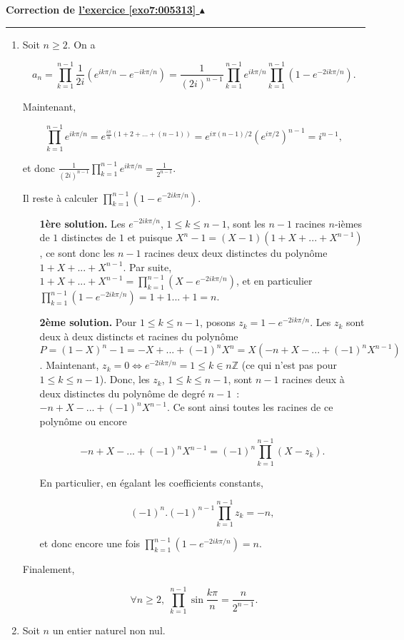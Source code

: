 \documentclass[11pt,a4paper]{article}
\newcommand{\Zz}{\mathbb{Z}} \newcommand{\Z}{\mathbb{Z}}
\newcounter{exo}
\newcommand{\correction}[1]{\hypertarget{cor7:#1}{}\label{cor7:#1}{\bf Correction de \hyperlink{exo7:#1}{l'exercice \ref{exo7:#1} $\blacktriangle$}}\vspace{1mm}\hrule\vspace{1mm}}
\begin{document}
\correction{005313}
\begin{enumerate}
\item  Soit $n\geq2$. On a 

$$a_n=\prod_{k=1}^{n-1}\frac{1}{2i}(e^{ik\pi/n}-e^{-ik\pi/n})=\frac{1}{(2i)^{n-1}}\prod_{k=1}^{n-1}e^{ik\pi/n}\prod_{k=1}^{n-1}(1-e^{-2ik\pi/n}).$$

Maintenant, 

$$\prod_{k=1}^{n-1}e^{ik\pi/n}=e^{\frac{i\pi}{n}(1+2+...+(n-1))}=e^{i\pi(n-1)/2}(e^{i\pi/2})^{n-1}=i^{n-1},$$

et donc $\frac{1}{(2i)^{n-1}}\prod_{k=1}^{n-1}e^{ik\pi/n}=\frac{1}{2^{n-1}}$.

Il reste à calculer $\prod_{k=1}^{n-1}(1-e^{-2ik\pi/n})$.

\begin{itemize}
\item[\textbf{1ère solution.}]
Les $e^{-2ik\pi/n}$, $1\leq k\leq n-1$, sont les $n-1$ racines $n$-ièmes de $1$ distinctes de $1$ et puisque 
$X^n-1=(X-1)(1+X+...+X^{n-1})$, ce sont donc les $n-1$ racines deux deux distinctes du polynôme $1+X+...+X^{n-1}$. Par suite, $1+X+...+X^{n-1}=\prod_{k=1}^{n-1}(X-e^{-2ik\pi/n})$, et en particulier $\prod_{k=1}^{n-1}(1-e^{-2ik\pi/n})=1+1...+1=n$.

\item[\textbf{2ème solution.}]
Pour $1\leq k\leq n-1$, posons $z_k=1-e^{-2ik\pi/n}$. Les $z_k$ sont deux à deux distincts et racines du polynôme 
$P=(1-X)^n-1=-X+...+(-1)^nX^n=X(-n+X-...+(-1)^nX^{n-1})$. Maintenant, $z_k=0\Leftrightarrow e^{-2ik\pi/n}=1\leq k\in n\Zz$ (ce qui n'est pas pour $1\leq k\leq n-1$). Donc, les $z_k$, $1\leq k\leq n-1$, sont $n-1$ racines deux à deux distinctes du polynôme de degré $n-1$~:~$-n+X-...+(-1)^nX^{n-1}$. Ce sont ainsi toutes les racines de ce polynôme ou encore

$$-n+X-...+(-1)^nX^{n-1}=(-1)^n\prod_{k=1}^{n-1}(X-z_k).$$

En particulier, en égalant les coefficients constants,

$$(-1)^n.(-1)^{n-1}\prod_{k=1}^{n-1}z_k=-n,$$

et donc encore une fois $\prod_{k=1}^{n-1}(1-e^{-2ik\pi/n})=n$.
\end{itemize}

Finalement,

$$\forall n\geq2,\;\prod_{k=1}^{n-1}\sin\frac{k\pi}{n}=\frac{n}{2^{n-1}}.$$

\item  Soit $n$ un entier naturel non nul.


\end{enumerate}
\end{document}
